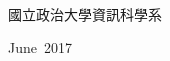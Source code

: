 \begin{acknowledgementsCH}

\setlength{\baselineskip}{1.5em}

\\
\\
\\

\raggedright{國立政治大學資訊科學系}

\raggedright{June\ 2017}

\end{acknowledgementsCH}
